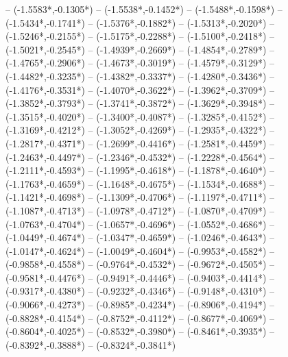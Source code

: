 {	-- ({-1.5583*\dx},{-0.1305*\dy})
	-- ({-1.5538*\dx},{-0.1452*\dy})
	-- ({-1.5488*\dx},{-0.1598*\dy})
	-- ({-1.5434*\dx},{-0.1741*\dy})
	-- ({-1.5376*\dx},{-0.1882*\dy})
	-- ({-1.5313*\dx},{-0.2020*\dy})
	-- ({-1.5246*\dx},{-0.2155*\dy})
	-- ({-1.5175*\dx},{-0.2288*\dy})
	-- ({-1.5100*\dx},{-0.2418*\dy})
	-- ({-1.5021*\dx},{-0.2545*\dy})
	-- ({-1.4939*\dx},{-0.2669*\dy})
	-- ({-1.4854*\dx},{-0.2789*\dy})
	-- ({-1.4765*\dx},{-0.2906*\dy})
	-- ({-1.4673*\dx},{-0.3019*\dy})
	-- ({-1.4579*\dx},{-0.3129*\dy})
	-- ({-1.4482*\dx},{-0.3235*\dy})
	-- ({-1.4382*\dx},{-0.3337*\dy})
	-- ({-1.4280*\dx},{-0.3436*\dy})
	-- ({-1.4176*\dx},{-0.3531*\dy})
	-- ({-1.4070*\dx},{-0.3622*\dy})
	-- ({-1.3962*\dx},{-0.3709*\dy})
	-- ({-1.3852*\dx},{-0.3793*\dy})
	-- ({-1.3741*\dx},{-0.3872*\dy})
	-- ({-1.3629*\dx},{-0.3948*\dy})
	-- ({-1.3515*\dx},{-0.4020*\dy})
	-- ({-1.3400*\dx},{-0.4087*\dy})
	-- ({-1.3285*\dx},{-0.4152*\dy})
	-- ({-1.3169*\dx},{-0.4212*\dy})
	-- ({-1.3052*\dx},{-0.4269*\dy})
	-- ({-1.2935*\dx},{-0.4322*\dy})
	-- ({-1.2817*\dx},{-0.4371*\dy})
	-- ({-1.2699*\dx},{-0.4416*\dy})
	-- ({-1.2581*\dx},{-0.4459*\dy})
	-- ({-1.2463*\dx},{-0.4497*\dy})
	-- ({-1.2346*\dx},{-0.4532*\dy})
	-- ({-1.2228*\dx},{-0.4564*\dy})
	-- ({-1.2111*\dx},{-0.4593*\dy})
	-- ({-1.1995*\dx},{-0.4618*\dy})
	-- ({-1.1878*\dx},{-0.4640*\dy})
	-- ({-1.1763*\dx},{-0.4659*\dy})
	-- ({-1.1648*\dx},{-0.4675*\dy})
	-- ({-1.1534*\dx},{-0.4688*\dy})
	-- ({-1.1421*\dx},{-0.4698*\dy})
	-- ({-1.1309*\dx},{-0.4706*\dy})
	-- ({-1.1197*\dx},{-0.4711*\dy})
	-- ({-1.1087*\dx},{-0.4713*\dy})
	-- ({-1.0978*\dx},{-0.4712*\dy})
	-- ({-1.0870*\dx},{-0.4709*\dy})
	-- ({-1.0763*\dx},{-0.4704*\dy})
	-- ({-1.0657*\dx},{-0.4696*\dy})
	-- ({-1.0552*\dx},{-0.4686*\dy})
	-- ({-1.0449*\dx},{-0.4674*\dy})
	-- ({-1.0347*\dx},{-0.4659*\dy})
	-- ({-1.0246*\dx},{-0.4643*\dy})
	-- ({-1.0147*\dx},{-0.4624*\dy})
	-- ({-1.0049*\dx},{-0.4604*\dy})
	-- ({-0.9953*\dx},{-0.4582*\dy})
	-- ({-0.9858*\dx},{-0.4558*\dy})
	-- ({-0.9764*\dx},{-0.4532*\dy})
	-- ({-0.9672*\dx},{-0.4505*\dy})
	-- ({-0.9581*\dx},{-0.4476*\dy})
	-- ({-0.9491*\dx},{-0.4446*\dy})
	-- ({-0.9403*\dx},{-0.4414*\dy})
	-- ({-0.9317*\dx},{-0.4380*\dy})
	-- ({-0.9232*\dx},{-0.4346*\dy})
	-- ({-0.9148*\dx},{-0.4310*\dy})
	-- ({-0.9066*\dx},{-0.4273*\dy})
	-- ({-0.8985*\dx},{-0.4234*\dy})
	-- ({-0.8906*\dx},{-0.4194*\dy})
	-- ({-0.8828*\dx},{-0.4154*\dy})
	-- ({-0.8752*\dx},{-0.4112*\dy})
	-- ({-0.8677*\dx},{-0.4069*\dy})
	-- ({-0.8604*\dx},{-0.4025*\dy})
	-- ({-0.8532*\dx},{-0.3980*\dy})
	-- ({-0.8461*\dx},{-0.3935*\dy})
	-- ({-0.8392*\dx},{-0.3888*\dy})
	-- ({-0.8324*\dx},{-0.3841*\dy})
}
